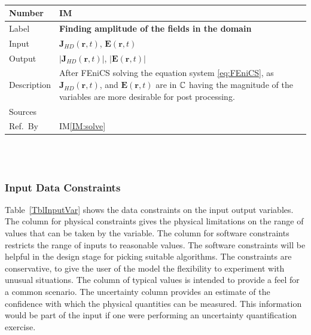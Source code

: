 \documentclass[12pt]{article}
\newcommand{\colBwidth}{0.82\textwidth} \newcommand{\colCwidth}{0.1\textwidth}
\newcounter{instnum} %
\begin{document}
	~\newline \noindent \begin{minipage}{\textwidth}
		\renewcommand*{\arraystretch}{1.5} \begin{tabular}{| p{\colAwidth} |
				p{\colBwidth}|} \hline \rowcolor[gray]{0.9} Number&
			IM{instnum}\theinstnum \label{IM:ampl}\\ \hline Label& \bf
			Finding amplitude of the fields in the domain\\ \hline Input&$\textbf{J}_{HD}(\textbf{r},t)$, $\textbf{E}(\textbf{r},t)$
			 \\
			\hline Output& $|\textbf{J}_{HD}(\textbf{r},t)|$, $|\textbf{E}(\textbf{r},t)|$
			\\
			\hline 
			Description&
			After FEniCS solving the equation system \ref{eq:FEniCS}, as $\textbf{J}_{HD}(\textbf{r},t)$, and  $\textbf{E}(\textbf{r},t)$ are in $\Bbb C$ having the magnitude of the variables are more desirable for post processing.
			 \\
			\hline Sources& \cite{monk2003finite} \\ \hline Ref.\ By &  IM\ref{IM:solve}\\ \hline \end{tabular} \end{minipage}\\
	
	~\newline
	
	

	
	
	\subsubsection{Input Data Constraints} \label{sec_DataConstraints}
	
	Table~\ref{TblInputVar} shows the data constraints on the input output
	variables.  The column for physical constraints gives the physical limitations
	on the range of values that can be taken by the variable.  The column for
	software constraints restricts the range of inputs to reasonable values.  The
	software constraints will be helpful in the design stage for picking suitable
	algorithms.  The constraints are conservative, to give the user of the model the
	flexibility to experiment with unusual situations.  The column of typical values
	is intended to provide a feel for a common scenario.  The uncertainty column
	provides an estimate of the confidence with which the physical quantities can be
	measured.  This information would be part of the input if one were performing an
	uncertainty quantification exercise.
	
\end{document}
